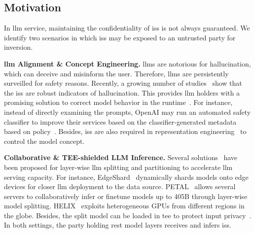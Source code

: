 \documentclass[letterpaper,twocolumn,10pt]{article}
\theoremstyle{definition}
\begin{document}
\subsection{Motivation}

In \ac{llm} service, maintaining the confidentiality of \acp{is} is not always guaranteed. We identify two scenarios in which \acp{is} may be exposed to an untrusted party for inversion.

\textbf{\ac{llm} Alignment \& Concept Engineering.}
\acp{llm} are notorious for hallucination, which can deceive and misinform the user. Therefore, \acp{llm} are persistently surveilled for safety reasons. Recently, a growing number of studies~\cite{chen2024inside,su-etal-2024-unsupervised,li2024safety,DBLP:journals/corr/abs-2406-15927,chen2024states,zhou-etal-2024-alignment} show that the \acp{is} are robust indicators of hallucination. This provides \ac{llm} holders with a promising solution to correct model behavior in the runtime~\cite{ye2024physics}.
For instance, instead of directly examining the prompts, OpenAI may run an automated safety classifier to improve their services based on the classifier-generated metadata based on policy~\cite{openai_business_datause}.
Besides, \acp{is} are also required in representation engineering~\cite{zou2023representation} to control the model concept.


\textbf{Collaborative \& TEE-shielded LLM Inference.}
Several solutions~\cite{borzunov-etal-2023-petals,lin2024splitlora,mei2024helix,zhang2024edgeshard} have been proposed for layer-wise \ac{llm} splitting and partitioning to accelerate \ac{llm} serving capacity.
For instance, 
EdgeShard~\cite{zhang2024edgeshard} dynamically shards models onto edge devices for closer \ac{llm} deployment to the data source.
PETAL~\cite{borzunov-etal-2023-petals} allows several servers to collaboratively infer or finetune models up to 405B through layer-wise model splitting.
HELIX~\cite{mei2024helix} exploits heterogeneous GPUs from different regions in the globe.
Besides, the split model can be loaded in \ac{tee} to protect input privacy~\cite{sun2023sp,Zhang:2024:odml}.
In both settings, the party holding rest model layers receives and infers \acp{is}.
\end{document}
